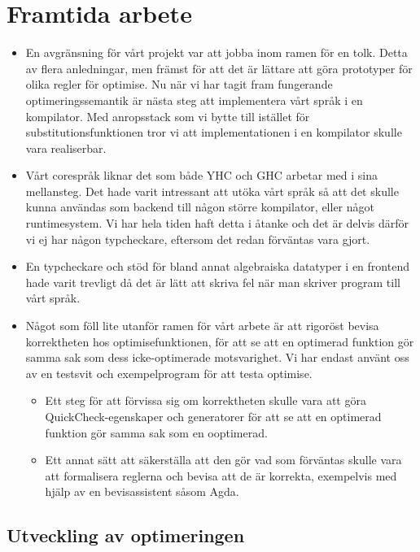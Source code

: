 \documentclass[Rapport]{subfiles}
\begin{document}
\section{Framtida arbete}
\begin{itemize}
\item En avgränsning för vårt projekt var att jobba inom ramen för en tolk. 
Detta av flera anledningar, men främst för att det är lättare att göra prototyper för 
olika regler för optimise. Nu när vi har tagit fram fungerande optimeringssemantik 
är nästa steg att implementera vårt språk i en kompilator.
Med anropsstack som vi bytte till istället för substitutionsfunktionen tror vi att implementationen
i en kompilator skulle vara realiserbar.


\item Vårt corespråk liknar det som både YHC och GHC arbetar med i sina mellansteg.
Det hade varit intressant att utöka vårt språk så att det skulle kunna 
användas som backend till någon större kompilator, eller något runtimesystem.
Vi har hela tiden haft detta i åtanke och det är delvis därför vi ej har någon 
typcheckare, eftersom det redan förväntas vara gjort.


\item En typcheckare och stöd för bland annat algebraiska datatyper i en 
frontend hade varit trevligt då det är lätt att skriva fel när man skriver
program till vårt språk. 


\item Något som föll lite utanför ramen för vårt arbete är att rigoröst bevisa
korrektheten hos optimisefunktionen, för att se att en optimerad funktion
gör samma sak som dess icke-optimerade motsvarighet. Vi har endast använt oss av en testsvit
och exempelprogram för att testa optimise. 

\begin{itemize}
\item Ett steg för att förvissa sig om korrektheten skulle vara att göra QuickCheck-egenskaper och generatorer för att se att en optimerad funktion gör samma sak som en ooptimerad. 
\item Ett annat sätt att säkerställa att den
gör vad som förväntas skulle vara att formalisera reglerna och bevisa
att de är korrekta, exempelvis med hjälp av en bevisassistent såsom Agda.
\end{itemize}

\end{itemize}
\subsection{Utveckling av optimeringen}
\end{document}
